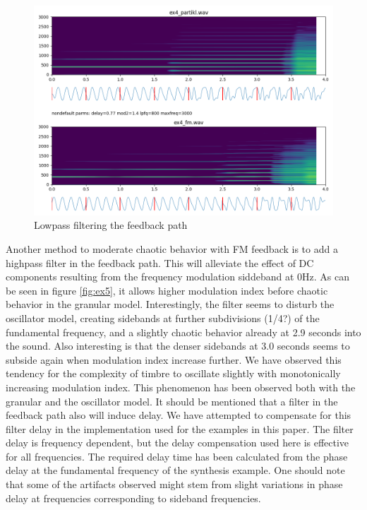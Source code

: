 \documentclass[runningheads,a4paper]{llncs}
\begin{document}
\begin{figure}
	\centering
	\includegraphics[width=.95\textwidth]{ex4_compare.png}
	\caption{Lowpass filtering the feedback path}
	\label{fig:ex4}
\end{figure}

Another method to moderate chaotic behavior with FM feedback is to add a highpass filter in the feedback path. This will alleviate the effect of DC components resulting from the frequency modulation siddeband at 0Hz.  As can be seen in figure \ref{fig:ex5},  it allows higher modulation index before chaotic behavior in the granular model. Interestingly, the filter seems to disturb the oscillator model, creating sidebands at further subdivisions (1/4?) of the fundamental frequency, and a slightly chaotic behavior already at 2.9 seconds into the sound. Also interesting is that the denser sidebands at 3.0 seconds seems to subside again when modulation index increase further. We have observed this tendency for the complexity of timbre to oscillate slightly with monotonically increasing modulation index. This phenomenon has been observed both with the granular and the oscillator model. It should be mentioned that a filter in the feedback path also will induce delay. We have attempted to compensate for this filter delay in the implementation used for the examples in this paper. The filter delay is frequency dependent, but the delay compensation used here is effective for all frequencies. The required delay time has been calculated from the phase delay at the fundamental frequency of the synthesis example. One should note that some of the artifacts observed might stem from slight variations in phase delay at frequencies corresponding to sideband frequencies.
\end{document}
